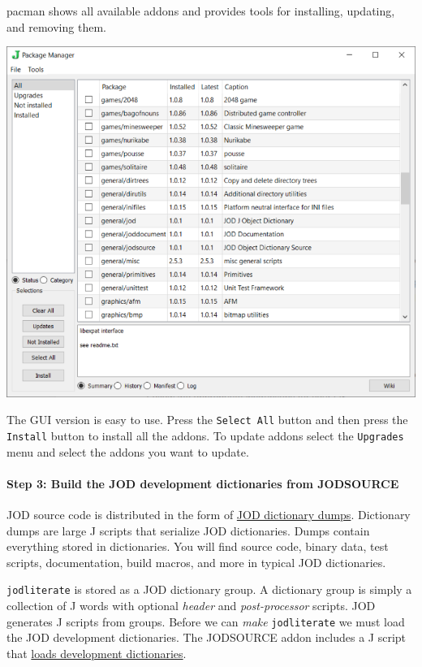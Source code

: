 \documentclass[11pt]{article}
\begin{document}
pacman shows all available addons and provides tools for installing,
updating, and removing them.

\includegraphics{inclusions/jqt_pacman.png}

The GUI version is easy to use. Press the \texttt{Select\ All} button
and then press the \texttt{Install} button to install all the addons. To
update addons select the \texttt{Upgrades} menu and select the addons
you want to update.

    \hypertarget{step-3-build-the-jod-development-dictionaries-from-jodsource}{%
\paragraph{Step 3: Build the JOD development dictionaries from
JODSOURCE}\label{step-3-build-the-jod-development-dictionaries-from-jodsource}}

JOD source code is distributed in the form of
\href{https://github.com/bakerjd99/joddumps}{JOD dictionary dumps}.
Dictionary dumps are large J scripts that serialize JOD dictionaries.
Dumps contain everything stored in dictionaries. You will find source
code, binary data, test scripts, documentation, build macros, and more
in typical JOD dictionaries.

\texttt{jodliterate} is stored as a JOD dictionary group. A dictionary
group is simply a collection of J words with optional \emph{header} and
\emph{post-processor} scripts. JOD generates J scripts from groups.
Before we can \emph{make} \texttt{jodliterate} we must load the JOD
development dictionaries. The JODSOURCE addon includes a J script that
\href{https://github.com/bakerjd99/jod/blob/master/jodsource/jodsourcesetup.ijs}{loads
development dictionaries}.
\end{document}
